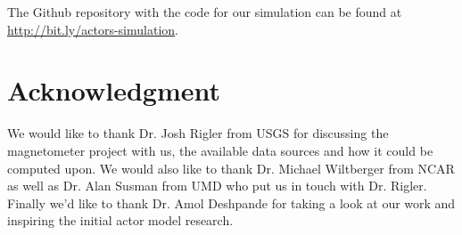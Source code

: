 \documentclass[conference,twocolumn,10pt]{IEEEtran}
\begin{document}

The Github repository with the code for our simulation can be found at \url{http://bit.ly/actors-simulation}.



\section*{Acknowledgment}
We would like to thank Dr. Josh Rigler from USGS for discussing the magnetometer project with us, the available data sources and how it could be computed upon. We would also like to thank Dr. Michael Wiltberger from NCAR as well as Dr. Alan Susman from UMD who put us in touch with Dr. Rigler. Finally we'd like to thank Dr. Amol Deshpande for taking a look at our work and inspiring the initial actor model research.






\end{document}
